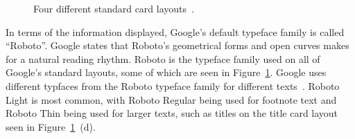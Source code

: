 	\begin{figure}[ht!]
		\centering
  	 \qquad
	\qquad
   	\qquad
   	\qquad
		\caption{Four different standard card layouts~\cite{cardLayout}.}
		\label{cardLayouts}
	\end{figure}

In terms of the information displayed, Google's default typeface family is called ``Roboto''. Google states that Roboto's geometrical forms and open curves makes for a natural reading rhythm.\cite{googleTypefaceRoboto} Roboto is the typeface family used on all of Google's standard layouts, some of which are seen in Figure~\ref{cardLayouts}. Google uses different typfaces from the Roboto typeface family for different texts~\cite{glassDesignStyle}. Roboto Light is most common, with Roboto Regular being used for footnote text and Roboto Thin being used for larger texts, such as titles on the title card layout seen in Figure~\ref{cardLayouts}~(d).

